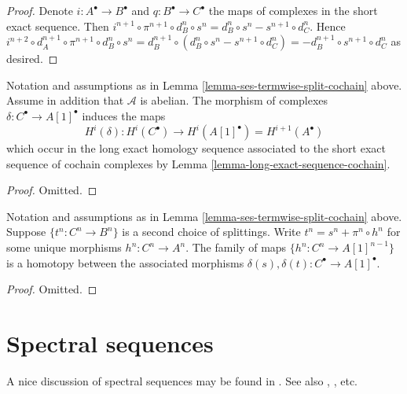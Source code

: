 \begin{proof}
Denote $i : A^\bullet \to B^\bullet$ and $q : B^\bullet \to C^\bullet$
the maps of complexes in the short exact sequence. Then
$i^{n + 1} \circ \pi^{n + 1} \circ d_B^n \circ s^n =
d_B^n \circ s^n - s^{n + 1} \circ d_C^n$. Hence
$i^{n + 2} \circ d_A^{n + 1} \circ \pi^{n + 1} \circ d_B^n \circ s^n =
d_B^{n + 1} \circ (d_B^n \circ s^n - s^{n + 1} \circ d_C^n) =
- d_B^{n + 1} \circ s^{n + 1} \circ d_C^n$ as desired.
\end{proof}

\begin{lemma}
\label{lemma-ses-termwise-split-long-cochain}
Notation and assumptions as in
Lemma \ref{lemma-ses-termwise-split-cochain} above.
Assume in addition that $\mathcal{A}$ is abelian.
The morphism of complexes $\delta : C^\bullet \to A[1]^\bullet$
induces the maps
$$
H^i(\delta) :
H^i(C^\bullet) \longrightarrow H^i(A[1]^\bullet) = H^{i + 1}(A^\bullet)
$$
which occur in the long exact homology sequence associated
to the short exact sequence of cochain complexes by
Lemma \ref{lemma-long-exact-sequence-cochain}.
\end{lemma}

\begin{proof}
Omitted.
\end{proof}

\begin{lemma}
\label{lemma-ses-termwise-split-homotopy-cochain}
Notation and assumptions as in
Lemma \ref{lemma-ses-termwise-split-cochain} above.
Suppose $\{t^n : C^n \to B^n\}$ is a second choice of splittings.
Write $t^n = s^n + \pi^n \circ h^n$ for some unique
morphisms $h^n : C^n \to A^n$. The family of maps
$\{h^n : C^n \to A[1]^{n - 1}\}$ is a homotopy between
the associated morphisms
$\delta(s), \delta(t) : C^\bullet \to A[1]^\bullet$.
\end{lemma}

\begin{proof}
Omitted.
\end{proof}












\section{Spectral sequences}
\label{section-spectral-sequence}

\noindent
A nice discussion of spectral sequences may be found in
\cite{Eisenbud}. See also \cite{McCleary}, \cite{Lang}, etc.

